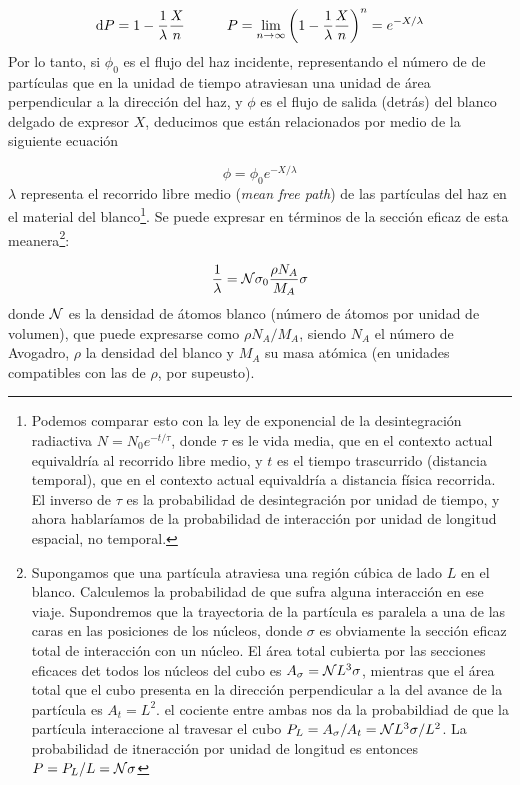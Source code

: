 \begin{equation}
    \mathrm{d} P = 1 - \frac{1}{\lambda} \frac{X}{n} \quad \quad \quad P = \lim_{n\rightarrow \infty} \left( 1 - \frac{1}{\lambda}\frac{X}{n} \right)^n = e^{-X/\lambda}
\end{equation}
Por lo tanto, si $\phi_0$ es el flujo del haz incidente, representando el número de de partículas que en la unidad de tiempo atraviesan una unidad de área perpendicular a la dirección del haz, y $\phi$ es el flujo de salida (detrás) del blanco delgado de expresor $X$, deducimos que están relacionados por medio de la siguiente ecuación 

\begin{equation}
    \phi = \phi_0 e^{-X/\lambda}
\end{equation}
$\lambda$ representa el recorrido libre medio (\textit{mean free path}) de las partículas del haz en el material del blanco\footnote{Podemos comparar esto con la ley de exponencial de la desintegración radiactiva $N=N_0 e^{-t/\tau}$, donde $\tau$ es le vida media, que en el contexto actual equivaldría al recorrido libre medio, y $t$ es el tiempo trascurrido (distancia temporal), que en el contexto actual equivaldría a distancia física recorrida. El inverso de $\tau$ es la probabilidad de desintegración por unidad de tiempo, y ahora hablaríamos de la probabilidad de interacción por unidad de longitud espacial, no temporal.}. Se puede expresar en términos de la sección eficaz de esta meanera\footnote{Supongamos que una partícula atraviesa una región cúbica de lado $L$ en el blanco. Calculemos la probabilidad de que sufra alguna interacción en ese viaje. Supondremos que la trayectoria de la partícula es paralela a una de las caras en las posiciones de los núcleos, donde $\sigma$ es obviamente la sección eficaz total de interacción con un núcleo. El área total cubierta por las secciones eficaces det todos los núcleos del cubo es $A_\sigma = \mathcal{N} L^3 \sigma$, mientras que el área total que el cubo presenta en la dirección perpendicular a la del avance de la partícula es $A_t=L^2$. el cociente entre ambas nos da la probabildiad de que la partícula interaccione al travesar el cubo $P_L  = A_\sigma / A_t = \mathcal{N} L^3 \sigma / L^2$. La probabilidad de itneracción por unidad de longitud es entonces $P=P_L/L=\mathcal{N} \sigma$}: \\

\Revisar

\begin{equation}
    \frac{1}{\lambda} = \mathcal{N} \sigma_0 \frac{\rho N_A }{M_A} \sigma 
\end{equation}
donde $\mathcal{N}$ es la densidad de átomos blanco (número de átomos por unidad de volumen), que puede expresarse como $\rho N_A /M_A$, siendo $N_A$ el número de Avogadro, $\rho$ la densidad del blanco y $M_A$ su masa atómica (en unidades compatibles con las de $\rho$, por supeusto). 

